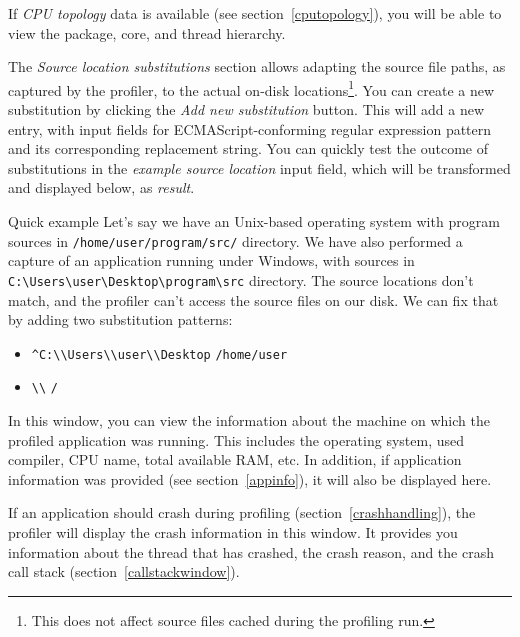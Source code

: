 \documentclass[hidelinks,titlepage,a4paper]{article}
\begin{document}
If \emph{CPU topology} data is available (see section~\ref{cputopology}), you will be able to view the package, core, and thread hierarchy.

The \emph{Source location substitutions} section allows adapting the source file paths, as captured by the profiler, to the actual on-disk locations\footnote{This does not affect source files cached during the profiling run.}. You can create a new substitution by clicking the \emph{Add new substitution} button. This will add a new entry, with input fields for ECMAScript-conforming regular expression pattern and its corresponding replacement string. You can quickly test the outcome of substitutions in the \emph{example source location} input field, which will be transformed and displayed below, as \emph{result}.

\begin{bclogo}[
noborder=true,
couleur=black!5,
logo=\bclampe
]{Quick example}
Let's say we have an Unix-based operating system with program sources in \texttt{/home/user/program/src/} directory. We have also performed a capture of an application running under Windows, with sources in \texttt{C:\textbackslash{}Users\textbackslash{}user\textbackslash{}Desktop\textbackslash{}program\textbackslash{}src} directory. The source locations don't match, and the profiler can't access the source files on our disk. We can fix that by adding two substitution patterns:

\begin{itemize}
\item \texttt{\^{}C:\textbackslash{}\textbackslash{}Users\textbackslash{}\textbackslash{}user\textbackslash{}\textbackslash{}Desktop} \hspace{1em}\textrightarrow\hspace{1em} \texttt{/home/user}
\item \texttt{\textbackslash{}\textbackslash{}} \hspace{1em}\textrightarrow\hspace{1em} \texttt{/}
\end{itemize}
\end{bclogo}

In this window, you can view the information about the machine on which the profiled application was running. This includes the operating system, used compiler, CPU name, total available RAM, etc. In addition, if application information was provided (see section~\ref{appinfo}), it will also be displayed here.

If an application should crash during profiling (section~\ref{crashhandling}), the profiler will display the crash information in this window. It provides you information about the thread that has crashed, the crash reason, and the crash call stack (section~\ref{callstackwindow}).
\end{document}
